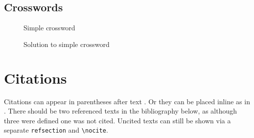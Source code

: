 \documentclass[11pt,a4paper]{article}
\begin{document}
\subsection{Crosswords}
\begin{figure}[H]

\caption{Simple crossword}
\end{figure}
\begin{figure}[H]
\PuzzleSolution

\caption{Solution to simple crossword}
\end{figure}

\section{Citations}
Citations can appear in parentheses after text \parencite{smith2013ex}. Or they can be placed
inline as in \textcite{jones2009eg}. There should be two referenced texts in the bibliography
below, as although three were defined one was not cited. Uncited texts can still be shown via
a separate \texttt{refsection} and \texttt{\textbackslash nocite}.

\printbibliography

\begin{refsection}
\nocite{foo1999ba}
\printbibliography[heading=subbibliography, title={Uncited}]
\end{refsection}
\end{document}
